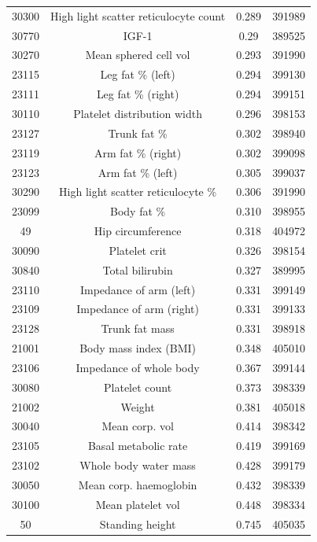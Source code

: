 \begin{longtable}{|c|c|c|c|}
30300 &  High light scatter reticulocyte count & 0.289 & 391989 \\
30770 &  IGF-1 & 0.29 & 389525 \\
30270 &  Mean sphered cell vol & 0.293 & 391990 \\
23115 & Leg fat \% (left) & 0.294 & 399130\\
23111 & Leg fat \% (right) & 0.294 & 399151\\
30110 &  Platelet distribution width & 0.296 & 398153 \\
23127 & Trunk fat \% & 0.302 & 398940\\
23119 & Arm fat \% (right) & 0.302 & 399098\\
23123 & Arm fat \% (left) & 0.305 & 399037\\
30290 &  High light scatter reticulocyte \% & 0.306 & 391990 \\
23099 & Body fat \% & 0.310 & 398955\\
49 & Hip circumference & 0.318 & 404972\\
30090 &  Platelet crit & 0.326 & 398154 \\
30840 &  Total bilirubin & 0.327 & 389995 \\
23110 & Impedance of arm (left) & 0.331 & 399149\\
23109 & Impedance of arm (right) & 0.331 & 399133 \\
23128 & Trunk fat mass & 0.331 & 398918 \\
21001 & Body mass index (BMI) & 0.348 & 405010\\
23106 & Impedance of whole body & 0.367 & 399144 \\
30080 &  Platelet count & 0.373 & 398339   \\
21002 & Weight & 0.381 & 405018 \\
30040 &  Mean corp. vol & 0.414 & 398342  \\
23105 & Basal metabolic rate & 0.419 & 399169 \\
23102 & Whole body water mass & 0.428 & 399179 \\
30050 &  Mean corp. haemoglobin & 0.432 & 398339 \\
30100 &  Mean platelet vol & 0.448 & 398334 \\
50 & Standing height & 0.745 & 405035 \\
\end{longtable}

